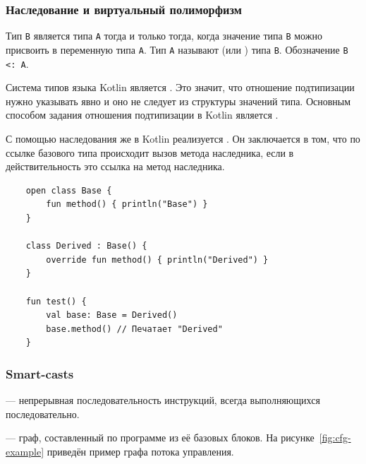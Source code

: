 \subsubsection{Наследование и виртуальный полиморфизм}

\begin{definition}
    \label{def:subtype}
    Тип \texttt{B} является  типа \texttt{A} тогда и только тогда, когда значение типа \texttt{B} можно присвоить в переменную типа \texttt{A}.
    Тип \texttt{A} называют  (или ) типа \texttt{B}.
    Обозначение \texttt{B <: A}.
\end{definition}

Система типов языка Kotlin является .
Это значит, что отношение подтипизации нужно указывать явно и оно не следует из структуры значений типа.
Основным способом задания отношения подтипизации в Kotlin является .

С помощью наследования же в Kotlin реализуется .
Он заключается в том, что по ссылке базового типа происходит вызов метода наследника, если в действительность это ссылка на метод наследника.
\begin{verbatim}
    open class Base {
        fun method() { println("Base") }
    }

    class Derived : Base() {
        override fun method() { println("Derived") }
    }

    fun test() {
        val base: Base = Derived()
        base.method() // Печатает "Derived"
    }
\end{verbatim}

\subsubsection{Smart-casts}\label{subsubsec:smart-casts}

\begin{definition}
    \label{def:basic-block}
     --- непрерывная последовательность инструкций, всегда выполняющихся последовательно.
\end{definition}

\begin{definition}
    \label{def:cfg}
     --- граф, составленный по программе из её базовых блоков.
    На рисунке~\ref{fig:cfg-example} приведён пример графа потока управления.
\end{definition}

